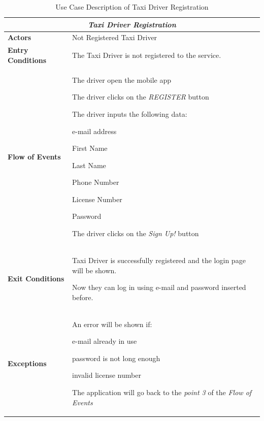 \documentclass[a4paper]{article}
\begin{document}
\begin{table} [H]
\begin{center}
\begin{tabular}{ |m{}|m{}|  }
\hline
    \multicolumn{2}{|c|}{\textbf{\textit{Taxi Driver Registration}}} \\
\hline \hline
    \textbf{Actors}
&   Not Registered Taxi Driver
\\ \hline
    \textbf{Entry Conditions}
&   The Taxi Driver is not registered to the service.
\\ \hline
    \textbf{Flow of Events}
& 
    \begin{enumerate*}
    \item The driver open the mobile app
    \item The driver clicks on the \emph{REGISTER} button
    \item The driver inputs the following data:
        \begin{enumerate*}
        \item e-mail address
        \item First Name
        \item Last Name
        \item Phone Number
        \item License Number
        \item Password
        \end{enumerate*}
    \item The driver clicks on the \emph{Sign Up!} button
    \end{enumerate*}
\\ \hline
    \textbf{Exit Conditions}
&   Taxi Driver is successfully registered and the login page will be shown. 

    Now they can log in using e-mail and password inserted before.
\\ \hline
    \textbf{Exceptions}
&   
    An error will be shown if:
    \begin{itemize*}
    \item e-mail already in use
    \item password is not long enough
    \item invalid license number
    \end{itemize*}
    The application will go back to the \emph{point 3} of the \emph{Flow of Events} 
\\ \hline
\end{tabular}
\end{center}
\caption{Use Case Description of Taxi Driver Registration}
\label{table:taxiregistration}
\end{table}
\end{document}
